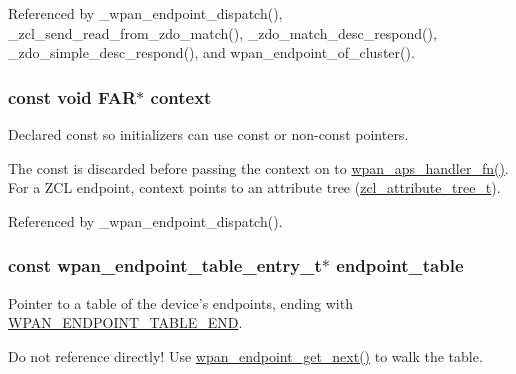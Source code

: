 Referenced by \-\_\-wpan\-\_\-endpoint\-\_\-dispatch(), \-\_\-zcl\-\_\-send\-\_\-read\-\_\-from\-\_\-zdo\-\_\-match(), \-\_\-zdo\-\_\-match\-\_\-desc\-\_\-respond(), \-\_\-zdo\-\_\-simple\-\_\-desc\-\_\-respond(), and wpan\-\_\-endpoint\-\_\-of\-\_\-cluster().

\hypertarget{group__wpan__aps_gad58378484a15ab673f5eb1613114330e}{
\subsubsection[{context}]{\setlength{\rightskip}{0pt plus 5cm}const void {\bf F\-A\-R}$\ast$ context}}\label{group__wpan__aps_gad58378484a15ab673f5eb1613114330e}


Declared {\ttfamily const} so initializers can use {\ttfamily const} or non-\/{\ttfamily const} pointers. 

The {\ttfamily const} is discarded before passing the context on to \hyperlink{group__wpan__aps_ga62b1036c0e296905f2d9a74e7e480297}{wpan\-\_\-aps\-\_\-handler\-\_\-fn()}. For a Z\-C\-L endpoint, {\ttfamily context} points to an attribute tree (\hyperlink{structzcl__attribute__tree__t}{zcl\-\_\-attribute\-\_\-tree\-\_\-t}). 

Referenced by \-\_\-wpan\-\_\-endpoint\-\_\-dispatch().

\hypertarget{group__wpan__aps_gad7c834ea25a2f008caaf40ec08aa5a86}{
\subsubsection[{endpoint\-\_\-table}]{\setlength{\rightskip}{0pt plus 5cm}const {\bf wpan\-\_\-endpoint\-\_\-table\-\_\-entry\-\_\-t}$\ast$ endpoint\-\_\-table}}\label{group__wpan__aps_gad7c834ea25a2f008caaf40ec08aa5a86}


Pointer to a table of the device's endpoints, ending with \hyperlink{group__wpan__aps_gaac571cafa96f8201c714feb0634afa92}{W\-P\-A\-N\-\_\-\-E\-N\-D\-P\-O\-I\-N\-T\-\_\-\-T\-A\-B\-L\-E\-\_\-\-E\-N\-D}. 

Do not reference directly! Use \hyperlink{group__wpan__aps_gaca3b72047ea4e156ce9a977c13624b5c}{wpan\-\_\-endpoint\-\_\-get\-\_\-next()} to walk the table. 

